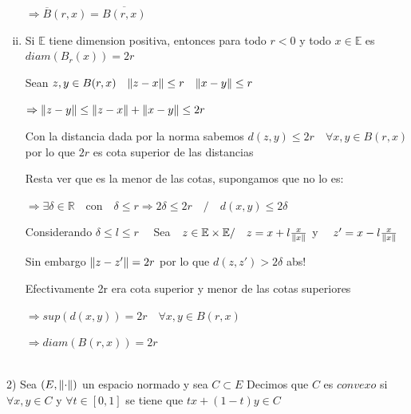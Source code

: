 \documentclass[12pt]{article}
\newcommand{\R}{\mathbb{R}}
\newcommand{\E}{\mathbb{E}}
\newcommand{\Ra}{\Rightarrow}
\newcommand{\ol}{\overline}
\DeclarePairedDelimiter{\norm}{\lVert}{\rVert}
\begin{document}
\begin{enumerate}[i.]
		$\Ra \ol B(r,x) = \ol {B(r,x)}$

			

	\item  Si $\E$ tiene dimension positiva, entonces para todo $r<0$ y todo $x\in\E$ es $diam (B_{r}(x)) = 2r$
	
		Sean $ z,y \in B(r,x) \quad \norm {z-x} \leq r \quad \norm {x-y} \leq r$  

		$\Ra \norm {z-y} \leq \norm {z-x} + \norm {x-y} \leq 2r $

		Con la distancia dada por la norma sabemos $d(z,y) \leq 2r \quad \forall x,y \in B(r,x)$ por lo que $2r$ es cota superior de las distancias 

		Resta ver que es la menor de las cotas, supongamos que no lo es:

		 $\Ra \exists \delta \in \R \quad $con$ \quad  \delta \leq r \Ra 2 \delta \leq 2r \quad/ \quad d(x,y) \leq 2\delta $

		 Considerando $ \delta \leq l \leq r \quad $ Sea$  \quad  z \in \E \times \E / \quad z = x + l\frac{x}{\norm {x}}$ y $\quad z' = x - l\frac{x}{\norm{x}}$


		 Sin embargo $\norm {z-z'} = 2r $ por lo que $d(z,z')>2\delta$ abs!

		 Efectivamente 2r era cota superior y menor de las cotas superiores

		 $\Ra sup(d(x,y))=2r \quad \forall x,y \in B(r,x) $

		 $\Ra diam(B(r,x))=2r$


\end{enumerate}

\newpage
\noindent \\
2) Sea $(E,\norm{\cdot})$ un espacio normado y sea $C \subset E$ Decimos que $C$ es $convexo$ si $\forall x,y \in C$ y $\forall t \in [0,1]$ se tiene que $tx + (1-t)y \in C$
\end{document}
